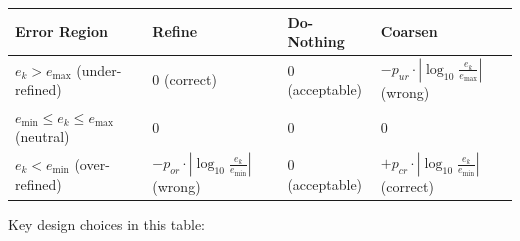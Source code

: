 \documentclass[11pt]{article}
\begin{document}
\vspace{0.3cm}
\begin{center}
\renewcommand{\arraystretch}{1.6}
\begin{tabular}{l >{\centering\arraybackslash}p{3cm} >{\centering\arraybackslash}p{3cm} >{\centering\arraybackslash}p{3cm}}
\toprule
\textbf{Error Region} & \textbf{Refine} & \textbf{Do-Nothing} & \textbf{Coarsen} \\
\midrule
$e_k > e_{\max}$ \newline (under-refined)
    & \textcolor{rewardzero}{0 \newline \footnotesize(correct)}
    & \textcolor{rewardzero}{0 \newline \footnotesize(acceptable)}
    & \textcolor{rewardneg}{$-p_{ur} \cdot |\!\log_{10}\!\frac{e_k}{e_{\max}}|$ \newline \footnotesize(wrong)} \\
\midrule
$e_{\min} \leq e_k \leq e_{\max}$ \newline (neutral)
    & \textcolor{rewardzero}{0}
    & \textcolor{rewardzero}{0}
    & \textcolor{rewardzero}{0} \\
\midrule
$e_k < e_{\min}$ \newline (over-refined)
    & \textcolor{rewardneg}{$-p_{or} \cdot |\!\log_{10}\!\frac{e_k}{e_{\min}}|$ \newline \footnotesize(wrong)}
    & \textcolor{rewardzero}{0 \newline \footnotesize(acceptable)}
    & \textcolor{rewardpos}{$+p_{cr} \cdot |\!\log_{10}\!\frac{e_k}{e_{\min}}|$ \newline \footnotesize(correct)} \\
\bottomrule
\end{tabular}
\end{center}

\vspace{0.3cm}
\noindent Key design choices in this table:
\end{document}
